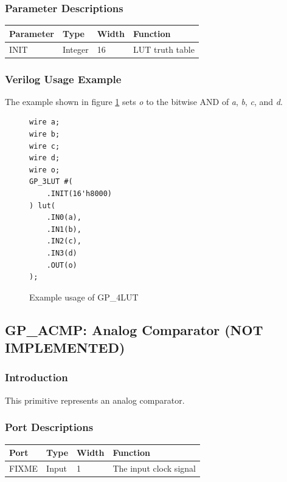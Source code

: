 \documentclass{article}
\begin{document}
\subsubsection{Parameter Descriptions}

\begin{tabularx}{4in}{|l|l|l|X|}
\hline
{\bfseries Parameter} & {\bfseries Type} & {\bfseries Width} & {\bfseries Function} \\
\hline
INIT & Integer & 16 & LUT truth table \\
\hline
\end{tabularx}

\subsubsection{Verilog Usage Example}

The example shown in figure \ref{gp-4LUT-example} sets \emph{o} to the bitwise AND of \emph{a}, \emph{b}, \emph{c},
and \emph{d}.

\begin{figure}[h]
\begin{lstlisting}
wire a;
wire b;
wire c;
wire d;
wire o;
GP_3LUT #(
	.INIT(16'h8000)
) lut(
	.IN0(a),
	.IN1(b),
	.IN2(c),
	.IN3(d)
	.OUT(o)
);
\end{lstlisting}
\caption{Example usage of GP\_4LUT}
\label{gp-4LUT-example}
\end{figure}


\pagebreak
\subsection{GP\_ACMP: Analog Comparator (NOT IMPLEMENTED)}

\subsubsection{Introduction}
This primitive represents an analog comparator.

\subsubsection{Port Descriptions}

\begin{tabularx}{5in}{|l|l|l|X|}
\hline
{\bfseries Port} & {\bfseries Type} & {\bfseries Width} & {\bfseries Function} \\
\hline
FIXME & Input & 1 & The input clock signal\\
\hline
\end{tabularx}
\end{document}
